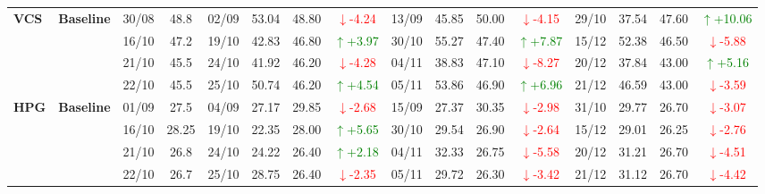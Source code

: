 {\begin{longtable}{llcc|cccc|cccc|cccc}
\multirow{4}{*}{\textbf{VCS}}
& \textbf{Baseline}
& 30/08 & 48.8 & 02/09 & 53.04 & 48.80 & \textcolor{red}{\(\downarrow\)-4.24} & 13/09 & 45.85 & 50.00 & \textcolor{red}{\(\downarrow\)-4.15} & 29/10 & 37.54 & 47.60 & \textcolor{green}{\(\uparrow\)+10.06} \\
& & 16/10 & 47.2 & 19/10 & 42.83 & 46.80 & \textcolor{green}{\(\uparrow\)+3.97} & 30/10 & 55.27 & 47.40 & \textcolor{green}{\(\uparrow\)+7.87} & 15/12 & 52.38 & 46.50 & \textcolor{red}{\(\downarrow\)-5.88} \\
& & 21/10 & 45.5 & 24/10 & 41.92 & 46.20 & \textcolor{red}{\(\downarrow\)-4.28} & 04/11 & 38.83 & 47.10 & \textcolor{red}{\(\downarrow\)-8.27} & 20/12 & 37.84 & 43.00 & \textcolor{green}{\(\uparrow\)+5.16} \\
& & 22/10 & 45.5 & 25/10 & 50.74 & 46.20 & \textcolor{green}{\(\uparrow\)+4.54} & 05/11 & 53.86 & 46.90 & \textcolor{green}{\(\uparrow\)+6.96} & 21/12 & 46.59 & 43.00 & \textcolor{red}{\(\downarrow\)-3.59} \\
\midrule

\multirow{4}{*}{\textbf{HPG}}
& \textbf{Baseline}
& 01/09 & 27.5 & 04/09 & 27.17 & 29.85 & \textcolor{red}{\(\downarrow\)-2.68} & 15/09 & 27.37 & 30.35 & \textcolor{red}{\(\downarrow\)-2.98} & 31/10 & 29.77 & 26.70 & \textcolor{red}{\(\downarrow\)-3.07} \\
& & 16/10 & 28.25 & 19/10 & 22.35 & 28.00 & \textcolor{green}{\(\uparrow\)+5.65} & 30/10 & 29.54 & 26.90 & \textcolor{red}{\(\downarrow\)-2.64} & 15/12 & 29.01 & 26.25 & \textcolor{red}{\(\downarrow\)-2.76} \\
& & 21/10 & 26.8 & 24/10 & 24.22 & 26.40 & \textcolor{green}{\(\uparrow\)+2.18} & 04/11 & 32.33 & 26.75 & \textcolor{red}{\(\downarrow\)-5.58} & 20/12 & 31.21 & 26.70 & \textcolor{red}{\(\downarrow\)-4.51} \\
& & 22/10 & 26.7 & 25/10 & 28.75 & 26.40 & \textcolor{red}{\(\downarrow\)-2.35} & 05/11 & 29.72 & 26.30 & \textcolor{red}{\(\downarrow\)-3.42} & 21/12 & 31.12 & 26.70 & \textcolor{red}{\(\downarrow\)-4.42} \\
\midrule


\end{longtable}}
